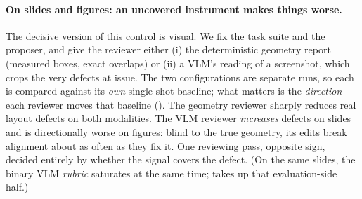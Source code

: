 \paragraph{On slides and figures: an uncovered instrument makes things worse.} The decisive version of this control is visual. We fix the task suite and the proposer, and give the reviewer either (i) the deterministic geometry report (measured boxes, exact overlaps) or (ii) a VLM's reading of a screenshot, which crops the very defects at issue. The two configurations are separate runs, so each is compared against its \emph{own} single-shot baseline; what matters is the \emph{direction} each reviewer moves that baseline (). The geometry reviewer sharply reduces real layout defects on both modalities. The VLM reviewer \emph{increases} defects on slides and is directionally worse on figures: blind to the true geometry, its edits break alignment about as often as they fix it. One reviewing pass, opposite sign, decided entirely by whether the signal covers the defect. (On the same slides, the binary VLM \emph{rubric} saturates at the same time;  takes up that evaluation-side half.)

